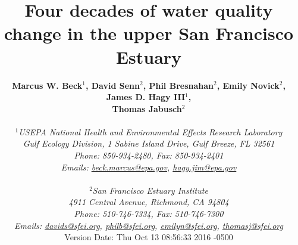 \documentclass[letterpaper,12pt,oneside]{article}\usepackage[]{graphicx}\usepackage[]{color}
\begin{document}
\raggedbottom
\linenumbers
\raggedright
{}
\setlength{\parindent}{0.5in}
\renewcommand\refname{References \vspace{12pt}}

\begin{singlespace}
\title{{\bf {\Large Four decades of water quality change in the upper San Francisco Estuary}}}
\author{
  {\bf {\normalsize Marcus W. Beck$^1$, David Senn$^2$, Phil Bresnahan$^2$, Emily Novick$^2$, James D. Hagy III$^1$,}}
  \\{\bf {\normalsize Thomas Jabusch$^2$}}
  \\\\{\textit {\normalsize $^1$USEPA National Health and Environmental Effects Research Laboratory}}
  \\{\textit {\normalsize Gulf Ecology Division, 1 Sabine Island Drive, Gulf Breeze, FL 32561}}
	\\{\textit {\normalsize Phone: 850-934-2480, Fax: 850-934-2401}}
	\\{\textit {\normalsize Emails: \href{mailto:beck.marcus@epa.gov}{beck.marcus@epa.gov}, \href{mailto:hagy.jim@epa.gov}{hagy.jim@epa.gov}}}
  \\\\{\textit {\normalsize $^2$San Francisco Estuary Institute}}
	\\{\textit {\normalsize 4911 Central Avenue, Richmond, CA 94804}}
	\\{\textit {\normalsize Phone: 510-746-7334, Fax: 510-746-7300}}
	\\{\textit {\normalsize Emails: \href{mailto:davids@sfei.org}{davids@sfei.org}, \href{mailto:philb@sfei.org}{philb@sfei.org}, \href{mailto:emilyn@sfei.org}{emilyn@sfei.org}, \href{mailto:thomasj@sfei.org}{thomasj@sfei.org}}}
  \vspace{1in} 
  \\ Version Date:   Thu Oct 13 08:56:33 2016 -0500
	}
\date{}
\maketitle
\end{singlespace}
\clearpage
\end{document}
